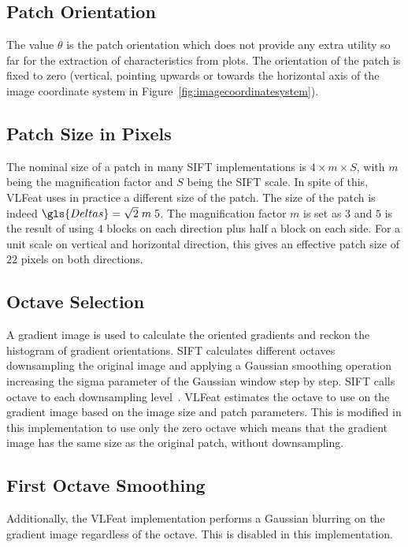 \subsection{Patch Orientation}

The value $\theta$ is the patch orientation which does not provide any extra utility so far for the extraction of characteristics from plots.  The orientation of the patch is fixed to zero (vertical, pointing upwards or towards the horizontal axis of the image coordinate system in Figure~\ref{fig:imagecoordinatesystem}).

\subsection{Patch Size in Pixels}

The nominal size of a patch in many SIFT implementations is $4 \times m \times S$, with $m$ being the magnification factor and $S$ being the SIFT scale.  In spite of this, VLFeat uses in practice a different size of the patch.  The size of the patch is indeed $\gls{Deltas} = \sqrt{2} \; m \; 5$.  The magnification factor $m$ is set as $3$ and $5$ is the result of using $4$ blocks on each direction plus half a block on each side.  For a unit scale on vertical and horizontal direction, this gives an effective patch size of $22$ pixels on both directions.

\subsection{Octave Selection}

A gradient image is used to calculate the oriented gradients and reckon the histogram of gradient orientations.   SIFT calculates different octaves downsampling the original image and applying a Gaussian smoothing operation increasing the sigma parameter of the Gaussian window step by step.  SIFT calls octave to each downsampling level~\cite{Lowe2004,Rey-Otero2014}. VLFeat estimates the octave to use on the gradient image based on the image size and patch parameters.   This is modified in this implementation to use only the zero octave which means that the gradient image has the same size as the original patch, without downsampling.

\subsection{First Octave Smoothing}

Additionally, the VLFeat implementation performs a Gaussian blurring on the gradient image regardless of the octave.  This is disabled in this implementation.

